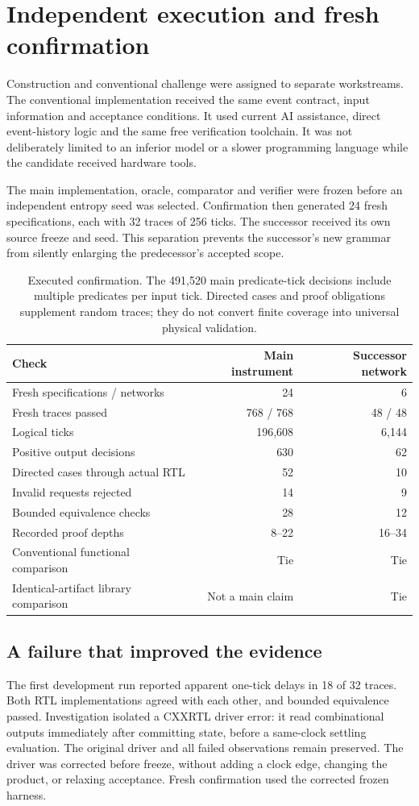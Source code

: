 \section{Independent execution and fresh confirmation}
Construction and conventional challenge were assigned to separate workstreams. The conventional implementation received the same event contract, input information and acceptance conditions. It used current AI assistance, direct event-history logic and the same free verification toolchain. It was not deliberately limited to an inferior model or a slower programming language while the candidate received hardware tools.

The main implementation, oracle, comparator and verifier were frozen before an independent entropy seed was selected. Confirmation then generated 24 fresh specifications, each with 32 traces of 256 ticks. The successor received its own source freeze and seed. This separation prevents the successor's new grammar from silently enlarging the predecessor's accepted scope.

\begin{table}[htbp]
\centering\small
\begin{tabular}{L{0.48\textwidth}rr}
\toprule Check & Main instrument & Successor network\\
\midrule
Fresh specifications / networks & 24 & 6\\
Fresh traces passed & 768 / 768 & 48 / 48\\
Logical ticks & 196,608 & 6,144\\
Positive output decisions & 630 & 62\\
Directed cases through actual RTL & 52 & 10\\
Invalid requests rejected & 14 & 9\\
Bounded equivalence checks & 28 & 12\\
Recorded proof depths & 8--22 & 16--34\\
Conventional functional comparison & Tie & Tie\\
Identical-artifact library comparison & Not a main claim & Tie\\
\bottomrule
\end{tabular}
\caption{Executed confirmation. The 491,520 main predicate-tick decisions include multiple predicates per input tick. Directed cases and proof obligations supplement random traces; they do not convert finite coverage into universal physical validation.}
\end{table}

\subsection{A failure that improved the evidence}
The first development run reported apparent one-tick delays in 18 of 32 traces. Both RTL implementations agreed with each other, and bounded equivalence passed. Investigation isolated a CXXRTL driver error: it read combinational outputs immediately after committing state, before a same-clock settling evaluation. The original driver and all failed observations remain preserved. The driver was corrected before freeze, without adding a clock edge, changing the product, or relaxing acceptance. Fresh confirmation used the corrected frozen harness.

